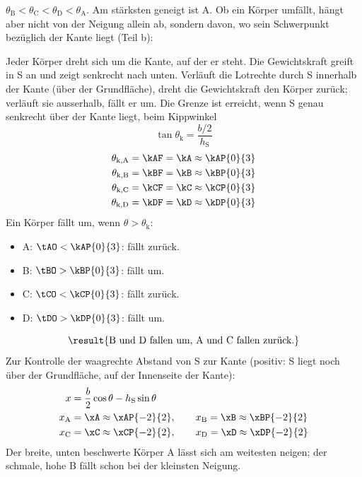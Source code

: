 \begin{abcliste}
\abc
$\theta_\mathrm{B} < \theta_\mathrm{C} < \theta_\mathrm{D} < \theta_\mathrm{A}$. Am stärksten geneigt ist A. Ob ein Körper umfällt, hängt aber nicht von der Neigung allein ab, sondern davon, wo sein Schwerpunkt bezüglich der Kante liegt (Teil b): 

\abc
Jeder Körper dreht sich um die Kante, auf der er steht. Die Gewichtskraft greift in S an und zeigt senkrecht nach unten. Verläuft die Lotrechte durch S innerhalb der Kante (über der Grundfläche), dreht die Gewichtskraft den Körper zurück; verläuft sie ausserhalb, fällt er um. Die Grenze ist erreicht, wenn S genau senkrecht über der Kante liegt, beim Kippwinkel
\[
 \tan\theta_\mathrm{k} = \frac{b/2}{h_\mathrm{S}}
\]
\begin{align}
 \theta_\mathrm{k,A} &= \kAF = \kA \approx \kAP{0}{3}\\
 \theta_\mathrm{k,B} &= \kBF = \kB \approx \kBP{0}{3}\\
 \theta_\mathrm{k,C} &= \kCF = \kC \approx \kCP{0}{3}\\
 \theta_\mathrm{k,D} &= \kDF = \kD \approx \kDP{0}{3}
\end{align}
Ein Körper fällt um, wenn $\theta > \theta_\mathrm{k}$:
\begin{itemize}
 \item A: $\tAO < \kAP{0}{3}$: fällt zurück.
 \item B: $\tBO > \kBP{0}{3}$: fällt um.
 \item C: $\tCO < \kCP{0}{3}$: fällt zurück.
 \item D: $\tDO > \kDP{0}{3}$: fällt um.
\end{itemize}
\[
 \result{\text{B und D fallen um, A und C fallen zurück.}}
\]
Zur Kontrolle der waagrechte Abstand von S zur Kante (positiv: S liegt noch über der Grundfläche, auf der Innenseite der Kante):
\begin{align}
 x &= \frac{b}{2}\cos\theta-h_\mathrm{S}\sin\theta\\
 x_\mathrm{A} &= \xA \approx \xAP{-2}{2}, \qquad x_\mathrm{B} = \xB \approx \xBP{-2}{2}\\
 x_\mathrm{C} &= \xC \approx \xCP{-2}{2}, \qquad x_\mathrm{D} = \xD \approx \xDP{-2}{2}
\end{align}
Der breite, unten beschwerte Körper A lässt sich am weitesten neigen; der schmale, hohe B fällt schon bei der kleinsten Neigung.
\end{abcliste}
